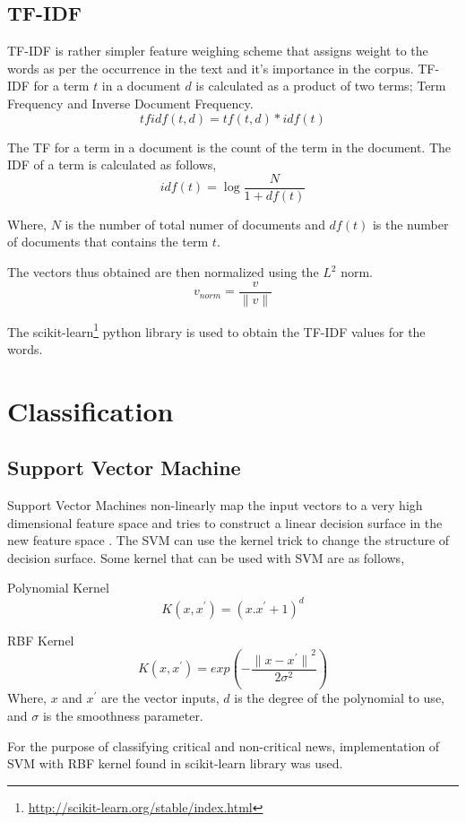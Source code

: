 \subsection{TF-IDF}
TF-IDF\cite{sparck1972statistical} is rather simpler feature weighing scheme that assigns weight to the words as per the occurrence in the text and it's importance in the corpus. TF-IDF for a term $t$ in a document $d$ is calculated as a product of two terms; Term Frequency and Inverse Document Frequency. 
\begin{equation}
    tfidf(t, d) = tf(t, d) * idf(t)
\end{equation}

The TF for a term in a document is the count of the term in the document. The IDF of a term is calculated as follows,
\begin{equation}
    idf(t) = \log{\frac{N}{1 + df(t)}}
\end{equation}

Where, $N$ is the number of total numer of documents and $df(t)$ is the number of documents that contains the term $t$.\par
The vectors thus obtained are then normalized using the $L^2$ norm.
\begin{equation}
    v_{norm} = \frac{v}{\lVert v \rVert}
\end{equation}

The scikit-learn\footnote{\url{http://scikit-learn.org/stable/index.html}} python library is used to obtain the TF-IDF values for the words.

\section{Classification}
\subsection{Support Vector Machine}
Support Vector Machines non-linearly map the input vectors to a very high dimensional feature space and tries to construct a linear decision surface in the new feature space \cite{cortes1995support}. The SVM can use the kernel trick to change the structure of decision surface\cite{cortes1995support}. Some kernel that can be used with SVM are as follows,

Polynomial Kernel
\begin{equation}
    \label{eq:polynomial_kernel}
    K(x, x^{'}) = {(x.x^{'} + 1)}^{d}
\end{equation}

RBF Kernel
\begin{equation}
    \label{eq:rbf_kernel}
    K(x, x^{'}) = exp(- \frac{{\lVert x - x^{'} \rVert}^{2}}{2 \sigma^{2}})
\end{equation}
Where, $x$ and $x^{'}$ are the vector inputs, $d$ is the degree of the polynomial to use, and $\sigma$ is the smoothness parameter.

For the purpose of classifying critical and non-critical news, implementation of SVM with RBF kernel found in scikit-learn library was used.